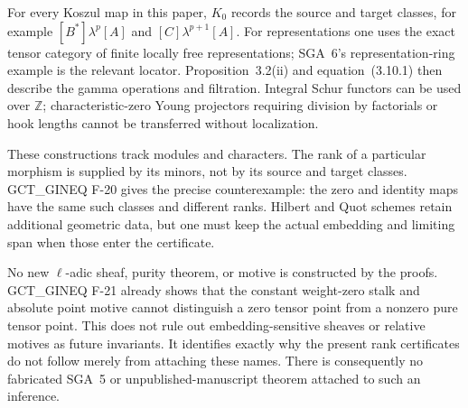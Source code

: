 For every Koszul map in this paper, $K_0$ records
the source and target classes, for example
$[B^*]\lambda^p[A]$ and $[C]\lambda^{p+1}[A]$.
For representations one uses the exact tensor
category of finite locally free representations;
SGA~6's representation-ring example is the relevant
locator. Proposition~3.2(ii) and equation~(3.10.1)
then describe the gamma operations and filtration.
Integral Schur functors can be used over
$\mathbb Z$; characteristic-zero Young projectors
requiring division by factorials or hook lengths
cannot be transferred without localization.

These constructions track modules and characters.
The rank of a particular morphism is supplied by
its minors, not by its source and target classes.
GCT\_GINEQ F-20 gives the precise counterexample:
the zero and identity maps have the same such
classes and different ranks. Hilbert and Quot
schemes retain additional geometric data, but
one must keep the actual embedding and limiting
span when those enter the certificate.

No new $\ell$-adic sheaf, purity theorem, or motive
is constructed by the proofs. GCT\_GINEQ F-21
already shows that the constant weight-zero stalk
and absolute point motive cannot distinguish a
zero tensor point from a nonzero pure tensor point.
This does not rule out embedding-sensitive sheaves
or relative motives as future invariants. It
identifies exactly why the present rank certificates
do not follow merely from attaching these names.
There is consequently no fabricated SGA~5 or
unpublished-manuscript theorem attached to such an
inference.


